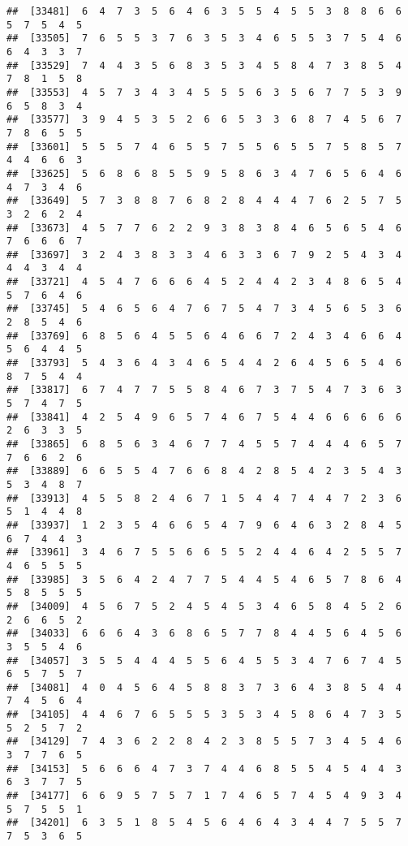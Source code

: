 \documentclass[
]{book}
\begin{document}
\begin{verbatim}
##  [33481]  6  4  7  3  5  6  4  6  3  5  5  4  5  5  3  8  8  6  6  5  7  5  4  5
##  [33505]  7  6  5  5  3  7  6  3  5  3  4  6  5  5  3  7  5  4  6  6  4  3  3  7
##  [33529]  7  4  4  3  5  6  8  3  5  3  4  5  8  4  7  3  8  5  4  7  8  1  5  8
##  [33553]  4  5  7  3  4  3  4  5  5  5  6  3  5  6  7  7  5  3  9  6  5  8  3  4
##  [33577]  3  9  4  5  3  5  2  6  6  5  3  3  6  8  7  4  5  6  7  7  8  6  5  5
##  [33601]  5  5  5  7  4  6  5  5  7  5  5  6  5  5  7  5  8  5  7  4  4  6  6  3
##  [33625]  5  6  8  6  8  5  5  9  5  8  6  3  4  7  6  5  6  4  6  4  7  3  4  6
##  [33649]  5  7  3  8  8  7  6  8  2  8  4  4  4  7  6  2  5  7  5  3  2  6  2  4
##  [33673]  4  5  7  7  6  2  2  9  3  8  3  8  4  6  5  6  5  4  6  7  6  6  6  7
##  [33697]  3  2  4  3  8  3  3  4  6  3  3  6  7  9  2  5  4  3  4  4  4  3  4  4
##  [33721]  4  5  4  7  6  6  6  4  5  2  4  4  2  3  4  8  6  5  4  5  7  6  4  6
##  [33745]  5  4  6  5  6  4  7  6  7  5  4  7  3  4  5  6  5  3  6  2  8  5  4  6
##  [33769]  6  8  5  6  4  5  5  6  4  6  6  7  2  4  3  4  6  6  4  5  6  4  4  5
##  [33793]  5  4  3  6  4  3  4  6  5  4  4  2  6  4  5  6  5  4  6  8  7  5  4  4
##  [33817]  6  7  4  7  7  5  5  8  4  6  7  3  7  5  4  7  3  6  3  5  7  4  7  5
##  [33841]  4  2  5  4  9  6  5  7  4  6  7  5  4  4  6  6  6  6  6  2  6  3  3  5
##  [33865]  6  8  5  6  3  4  6  7  7  4  5  5  7  4  4  4  6  5  7  7  6  6  2  6
##  [33889]  6  6  5  5  4  7  6  6  8  4  2  8  5  4  2  3  5  4  3  5  3  4  8  7
##  [33913]  4  5  5  8  2  4  6  7  1  5  4  4  7  4  4  7  2  3  6  5  1  4  4  8
##  [33937]  1  2  3  5  4  6  6  5  4  7  9  6  4  6  3  2  8  4  5  6  7  4  4  3
##  [33961]  3  4  6  7  5  5  6  6  5  5  2  4  4  6  4  2  5  5  7  4  6  5  5  5
##  [33985]  3  5  6  4  2  4  7  7  5  4  4  5  4  6  5  7  8  6  4  5  8  5  5  5
##  [34009]  4  5  6  7  5  2  4  5  4  5  3  4  6  5  8  4  5  2  6  2  6  6  5  2
##  [34033]  6  6  6  4  3  6  8  6  5  7  7  8  4  4  5  6  4  5  6  3  5  5  4  6
##  [34057]  3  5  5  4  4  4  5  5  6  4  5  5  3  4  7  6  7  4  5  6  5  7  5  7
##  [34081]  4  0  4  5  6  4  5  8  8  3  7  3  6  4  3  8  5  4  4  7  4  5  6  4
##  [34105]  4  4  6  7  6  5  5  5  3  5  3  4  5  8  6  4  7  3  5  5  2  5  7  2
##  [34129]  7  4  3  6  2  2  8  4  2  3  8  5  5  7  3  4  5  4  6  3  7  7  6  5
##  [34153]  5  6  6  6  4  7  3  7  4  4  6  8  5  5  4  5  4  4  3  6  3  7  7  5
##  [34177]  6  6  9  5  7  5  7  1  7  4  6  5  7  4  5  4  9  3  4  5  7  5  5  1
##  [34201]  6  3  5  1  8  5  4  5  6  4  6  4  3  4  4  7  5  5  7  7  5  3  6  5

\end{verbatim}
\end{document}
